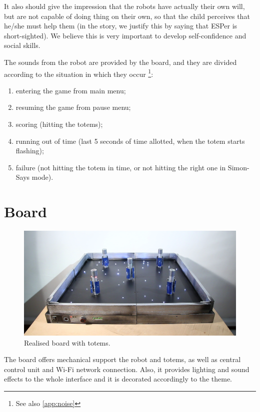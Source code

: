 \documentclass[a4paper,twoside]{book}
\begin{document}
It also should give the impression that the robots have actually their own will, but are not capable of doing thing on their own, so that the child perceives that he/she must help them (in the story, we justify this by saying that ESPer is short-sighted). We believe this is very important to develop self-confidence and social skills.

\beforelist* The sounds from the robot are provided by the board, and they are divided according to the situation in which they occur%
\footnote{See also \autoref{app:noise}}:
\begin{enumerate}
\item entering the game from main menu;
\item resuming the game from pause menu;
\item scoring (hitting the totems);
\item running out of time (last 5 seconds of time allotted, when the totem starts flashing);
\item failure (not hitting the totem in time, or not hitting the right one in Simon-Says mode).
\end{enumerate}
\afterlist*

\section{Board}

\begin{figure}[h]
\includegraphics[width=\linewidth]{img/IMG_20160616_111353} 
\caption{Realised board with totems.}
\end{figure}

The board offers mechanical support the robot and totems, as well as central control unit and Wi-Fi network connection. Also, it provides lighting and sound effects to the whole interface and it is decorated accordingly to the theme.
\end{document}
